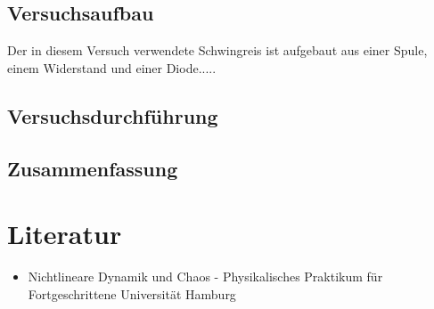 \documentclass{scrartcl}
\begin{document}
\subsection{ Versuchsaufbau}
Der in diesem Versuch verwendete Schwingreis ist aufgebaut aus einer Spule, einem Widerstand und einer Diode.....

\subsection { Versuchsdurchführung }

\subsection { Zusammenfassung }

\section{ Literatur }
\begin{itemize} 
\item Nichtlineare Dynamik und Chaos - Physikalisches Praktikum für Fortgeschrittene Universität Hamburg
\end{itemize}
\end{document}
